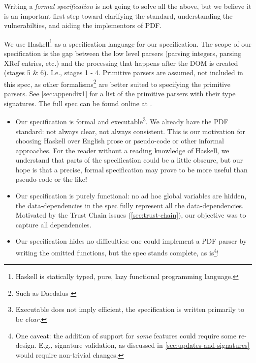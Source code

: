 Writing a \emph{formal specification} is not going to solve all the above,
but we believe it is an important first step toward clarifying the
standard, understanding the vulnerabilties, and aiding the
implementors of PDF.

We use Haskell\footnote{
Haskell is statically typed, pure, lazy functional programming
language\cite{Haskell}.
}
as a specification language for our specification.
%
The scope of our specification is the gap between the low
level parsers (parsing integers, parsing XRef entries, etc.) and the
processing that happens after the DOM is created (stages 5 \& 6).
I.e., stages 1 - 4.
%
Primitive parsers are assumed, not included in this spec,
as other formalisms\footnote{Such as Daedalus \cite{daedaluspaper,daedalusrepo}}
are better suited to specifying the primitive parsers.
See \cref{sec:appendix1} for a list of the primitive parsers
with their type signatures.
%
The full spec can be found online at \cite{daedalusrepo}.

\begin{itemize}
\item Our specification is formal and executable\footnote{
  Executable does not imply efficient, the specification is written
  primarily to be \emph{clear}.}.
  We already have the PDF standard: not always clear, not always
  consistent. 
  This is our motivation for choosing Haskell over English prose or
  pseudo-code or other informal approaches.
  For the reader
  without a reading knowledge of Haskell, we understand that parts of
  the specification could be a little obscure, but our hope is that a
  precise, formal specification may prove to be more useful than
  pseudo-code or the like!
  
\item Our specification is purely functional: no ad hoc global variables are
  hidden, the data-dependencies in the spec fully represent all the
  data-dependencies.  Motivated by the Trust Chain issues
  (\cref{sec:trust-chain}), our objective was to capture all dependencies.
  
\item Our specification hides no difficulties: one could implement a PDF parser
  by writing the omitted functions, but the spec stands complete, as
  is\footnote{One caveat: the addition of support for \emph{some} features
  could require some re-design.  E.g., signature validation, as discussed in
  \cref{sec:updates-and-signatures} would require non-trivial changes.
  }!
\end{itemize}

